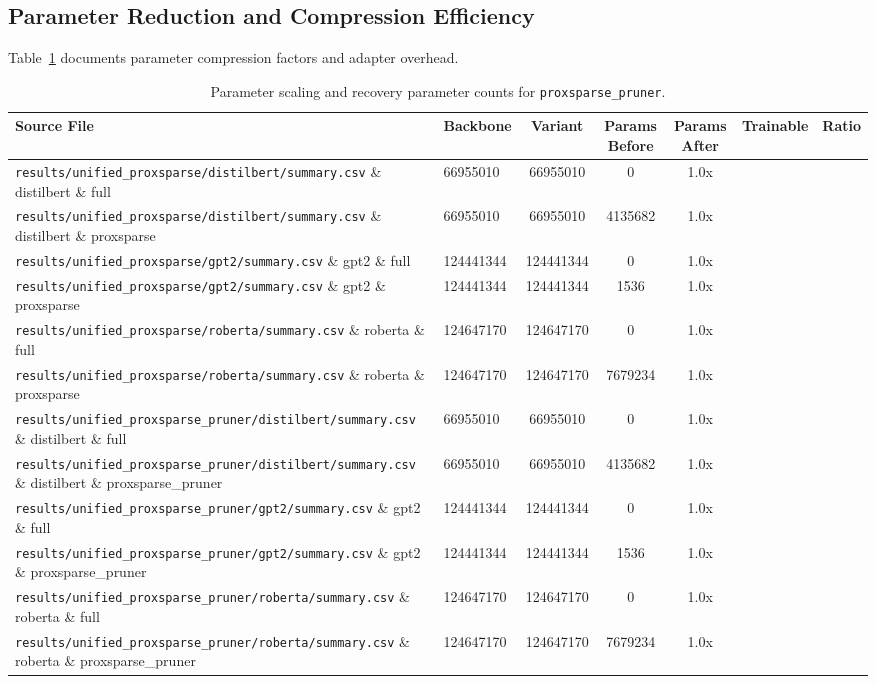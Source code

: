 \subsection{Parameter Reduction and Compression Efficiency}
Table~\ref{tab:results_params_proxsparse\_pruner} documents parameter compression factors and adapter overhead.

\begin{table}[t]
\centering
\small
\begin{tabularx}{\linewidth}{llccccc}
\toprule
\textbf{Source File} & \textbf{Backbone} & \textbf{Variant} & \textbf{Params Before} & \textbf{Params After} & \textbf{Trainable} & \textbf{Ratio} \\
\midrule
\texttt{results/unified\_proxsparse/distilbert/summary.csv} \& distilbert \& full & 66955010 & 66955010 & 0 & 1.0x \\
\texttt{results/unified\_proxsparse/distilbert/summary.csv} \& distilbert \& proxsparse & 66955010 & 66955010 & 4135682 & 1.0x \\
\texttt{results/unified\_proxsparse/gpt2/summary.csv} \& gpt2 \& full & 124441344 & 124441344 & 0 & 1.0x \\
\texttt{results/unified\_proxsparse/gpt2/summary.csv} \& gpt2 \& proxsparse & 124441344 & 124441344 & 1536 & 1.0x \\
\texttt{results/unified\_proxsparse/roberta/summary.csv} \& roberta \& full & 124647170 & 124647170 & 0 & 1.0x \\
\texttt{results/unified\_proxsparse/roberta/summary.csv} \& roberta \& proxsparse & 124647170 & 124647170 & 7679234 & 1.0x \\
\texttt{results/unified\_proxsparse\_pruner/distilbert/summary.csv} \& distilbert \& full & 66955010 & 66955010 & 0 & 1.0x \\
\texttt{results/unified\_proxsparse\_pruner/distilbert/summary.csv} \& distilbert \& proxsparse\_pruner & 66955010 & 66955010 & 4135682 & 1.0x \\
\texttt{results/unified\_proxsparse\_pruner/gpt2/summary.csv} \& gpt2 \& full & 124441344 & 124441344 & 0 & 1.0x \\
\texttt{results/unified\_proxsparse\_pruner/gpt2/summary.csv} \& gpt2 \& proxsparse\_pruner & 124441344 & 124441344 & 1536 & 1.0x \\
\texttt{results/unified\_proxsparse\_pruner/roberta/summary.csv} \& roberta \& full & 124647170 & 124647170 & 0 & 1.0x \\
\texttt{results/unified\_proxsparse\_pruner/roberta/summary.csv} \& roberta \& proxsparse\_pruner & 124647170 & 124647170 & 7679234 & 1.0x \\
\bottomrule
\end{tabularx}
\caption{Parameter scaling and recovery parameter counts for \texttt{proxsparse\_pruner}.}
\label{tab:results_params_proxsparse\_pruner}
\end{table}

